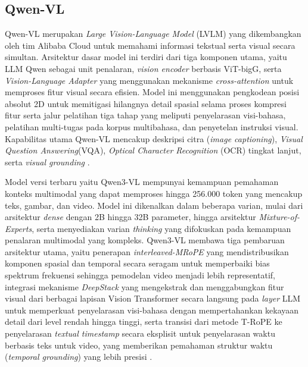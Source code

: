 \subsection{Qwen-VL}

Qwen-VL merupakan \textit{Large Vision-Language Model} (LVLM) yang dikembangkan oleh tim Alibaba Cloud untuk memahami informasi tekstual serta visual secara simultan. Arsitektur dasar model ini terdiri dari tiga komponen utama, yaitu LLM Qwen sebagai unit penalaran, \textit{vision encoder} berbasis ViT-bigG, serta \textit{Vision-Language Adapter} yang menggunakan mekanisme \textit{cross-attention} untuk memproses fitur visual secara efisien. Model ini menggunakan pengkodean posisi absolut 2D untuk memitigasi hilangnya detail spasial selama proses kompresi fitur serta jalur pelatihan tiga tahap yang meliputi penyelarasan visi-bahasa, pelatihan multi-tugas pada korpus multibahasa, dan penyetelan instruksi visual. Kapabilitas utama Qwen-VL mencakup deskripsi citra (\textit{image captioning}), \textit{Visual Question Answering}(VQA), \textit{Optical Character Recognition} (OCR) tingkat lanjut, serta \textit{visual grounding} \parencite{Bai2023}.

Model versi terbaru yaitu Qwen3-VL mempunyai kemampuan pemahaman konteks multimodal yang dapat memproses hingga 256.000 token yang mencakup teks, gambar, dan video. Model ini dikenalkan dalam beberapa varian, mulai dari arsitektur \textit{dense} dengan 2B hingga 32B parameter, hingga arsitektur \textit{Mixture-of-Experts}, serta menyediakan varian \textit{thinking} yang difokuskan pada kemampuan penalaran multimodal yang kompleks. Qwen3-VL membawa tiga pembaruan arsitektur utama, yaitu penerapan \textit{interleaved-MRoPE} yang mendistribusikan komponen spasial dan temporal secara seragam untuk memperbaiki bias spektrum frekuensi sehingga pemodelan video menjadi lebih representatif, integrasi mekanisme \textit{DeepStack} yang mengekstrak dan menggabungkan fitur visual dari berbagai lapisan Vision Transformer secara langsung pada \textit{layer} LLM untuk memperkuat penyelarasan visi-bahasa dengan mempertahankan kekayaan detail dari level rendah hingga tinggi, serta transisi dari metode T-RoPE ke penyelarasan \textit{textual timestamp} secara eksplisit untuk penyelarasan waktu berbasis teks untuk video, yang memberikan pemahaman struktur waktu (\textit{temporal grounding}) yang lebih presisi \parencite{Bai2025Qwen3}.



